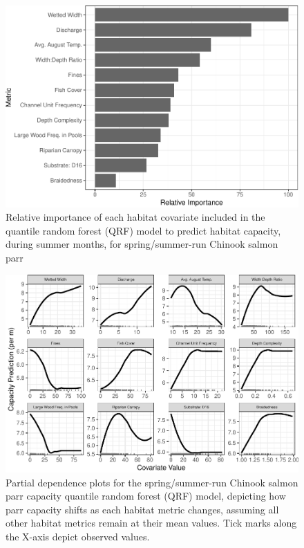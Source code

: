 \documentclass[
  12pt,
]{article}
\begin{document}
\begin{figure}
\centering
\includegraphics{figures/rel-imp-figure-1.pdf}
\caption{\label{fig:rel-imp-figure}Relative importance of each habitat covariate included in the quantile random forest (QRF) model to predict habitat capacity, during summer months, for spring/summer-run Chinook salmon parr}
\end{figure}

\newpage

\begin{figure}
\centering
\includegraphics{figures/pdp-figure-1.pdf}
\caption{\label{fig:pdp-figure}Partial dependence plots for the spring/summer-run Chinook salmon parr capacity quantile random forest (QRF) model, depicting how parr capacity shifts as each habitat metric changes, assuming all other habitat metrics remain at their mean values. Tick marks along the X-axis depict observed values.}
\end{figure}
\end{document}
